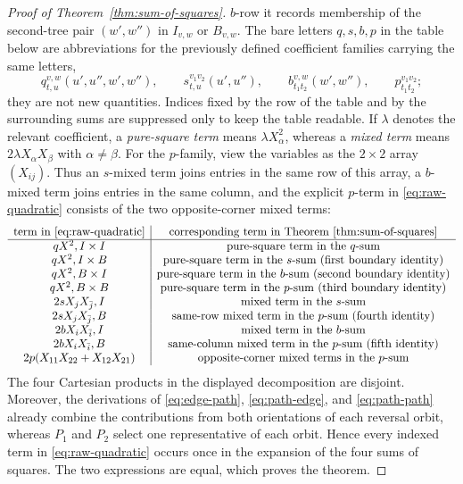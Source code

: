 \documentclass[12pt]{article}
\begin{document}
\begin{proof}[Proof of Theorem~\ref{thm:sum-of-squares}]
$b$-row it records membership of the second-tree pair $(w',w'')$ in
$I_{v,w}$ or $B_{v,w}$.  The
bare letters $q,s,b,p$
in the table below are abbreviations for the previously defined coefficient
families carrying the same letters,
\begin{equation}\label{eq:display-048}
q_{t,u}^{v,w}(u',u'',w',w''),\qquad
s_{t,u}^{v_1v_2}(u',u''),\qquad
b_{t_1t_2}^{v,w}(w',w''),\qquad
p_{t_1t_2}^{v_1v_2};
\end{equation}
they are not new quantities.  Indices fixed by the row of the table and by
the surrounding sums are suppressed only to keep the table readable.  If
$\lambda$ denotes the relevant coefficient, a \emph{pure-square term} means
$\lambda X_\alpha^2$, whereas a \emph{mixed term} means
$2\lambda X_\alpha X_\beta$ with $\alpha\ne\beta$.  For the
$p$-family, view the variables as the $2\times2$ array $(X_{ij})$.  Thus an
$s$-mixed term joins entries in the same row of this array, a $b$-mixed term
joins entries in the same column, and the explicit $p$-term in
\eqref{eq:raw-quadratic} consists of the two opposite-corner mixed terms:
\[
\begin{array}{c|c}
\text{term in \eqref{eq:raw-quadratic}}&
\text{corresponding term in Theorem~\ref{thm:sum-of-squares}}\\ \hline
qX^2, I\times I&\text{pure-square term in the }q\text{-sum}\\
qX^2, I\times B&\text{pure-square term in the }s\text{-sum (first boundary identity)}\\
qX^2, B\times I&\text{pure-square term in the }b\text{-sum (second boundary identity)}\\
qX^2, B\times B&\text{pure-square term in the }p\text{-sum (third boundary identity)}\\
2sX_jX_{\bar j}, I&\text{mixed term in the }s\text{-sum}\\
2sX_jX_{\bar j}, B&\text{same-row mixed term in the }p\text{-sum (fourth identity)}\\
2bX_iX_{\bar i}, I&\text{mixed term in the }b\text{-sum}\\
2bX_iX_{\bar i}, B&\text{same-column mixed term in the }p\text{-sum (fifth identity)}\\
2p(X_{11}X_{22}+X_{12}X_{21})&
\text{opposite-corner mixed terms in the }p\text{-sum}
\end{array}
\]
The four Cartesian products in the displayed decomposition are disjoint.
Moreover,
the derivations of \eqref{eq:edge-path}, \eqref{eq:path-edge}, and
\eqref{eq:path-path} already combine the contributions from both orientations
of each reversal orbit, whereas $P_1$ and $P_2$ select one representative of
each orbit.  Hence every indexed term in \eqref{eq:raw-quadratic} occurs once
in the expansion of the four sums of squares.  The two expressions are equal,
which proves the theorem.
\end{proof}
\end{document}
